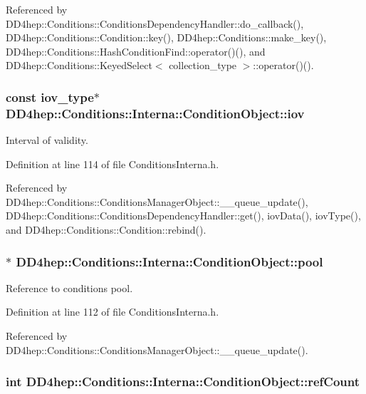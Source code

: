 Referenced by DD4hep::Conditions::ConditionsDependencyHandler::do\_\-callback(), DD4hep::Conditions::Condition::key(), DD4hep::Conditions::make\_\-key(), DD4hep::Conditions::HashConditionFind::operator()(), and DD4hep::Conditions::KeyedSelect$<$ collection\_\-type $>$::operator()().\hypertarget{class_d_d4hep_1_1_conditions_1_1_interna_1_1_condition_object_af04a3341b8791fbcf60fe5e5fff20166}{
\subsubsection[{iov}]{\setlength{\rightskip}{0pt plus 5cm}const {\bf iov\_\-type}$\ast$ {\bf DD4hep::Conditions::Interna::ConditionObject::iov}}}
\label{class_d_d4hep_1_1_conditions_1_1_interna_1_1_condition_object_af04a3341b8791fbcf60fe5e5fff20166}


Interval of validity. 

Definition at line 114 of file ConditionsInterna.h.

Referenced by DD4hep::Conditions::ConditionsManagerObject::\_\-\_\-queue\_\-update(), DD4hep::Conditions::ConditionsDependencyHandler::get(), iovData(), iovType(), and DD4hep::Conditions::Condition::rebind().\hypertarget{class_d_d4hep_1_1_conditions_1_1_interna_1_1_condition_object_a47997f68ec8b07ffe938d869726b6012}{
\subsubsection[{pool}]{$\ast$ {\bf DD4hep::Conditions::Interna::ConditionObject::pool}}}
\label{class_d_d4hep_1_1_conditions_1_1_interna_1_1_condition_object_a47997f68ec8b07ffe938d869726b6012}


Reference to conditions pool. 

Definition at line 112 of file ConditionsInterna.h.

Referenced by DD4hep::Conditions::ConditionsManagerObject::\_\-\_\-queue\_\-update().\hypertarget{class_d_d4hep_1_1_conditions_1_1_interna_1_1_condition_object_a0a8d0c67b38ca524010ed5d6ccdd1961}{
\subsubsection[{refCount}]{\setlength{\rightskip}{0pt plus 5cm}int {\bf DD4hep::Conditions::Interna::ConditionObject::refCount}}}
\label{class_d_d4hep_1_1_conditions_1_1_interna_1_1_condition_object_a0a8d0c67b38ca524010ed5d6ccdd1961}



